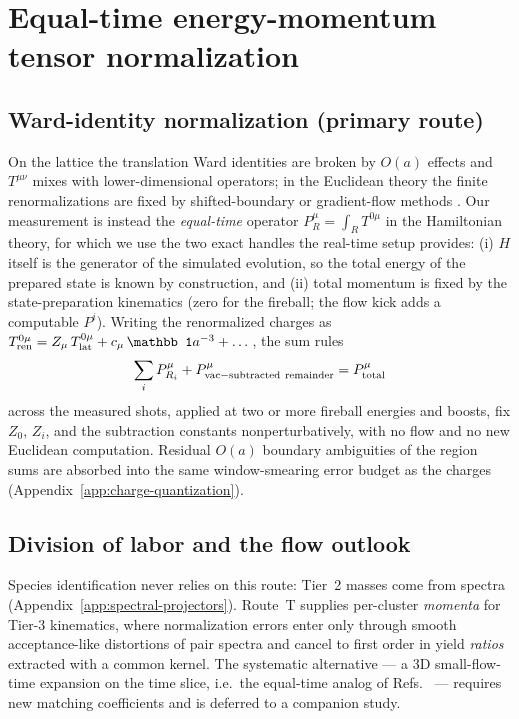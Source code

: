 \section{Equal-time energy-momentum tensor normalization}
\label{app:emt}

\subsection{Ward-identity normalization (primary route)}

On the lattice the translation Ward identities are broken by $O(a)$
effects and $T^{\mu\nu}$ mixes with lower-dimensional operators; in the
Euclidean theory the finite renormalizations are fixed by
shifted-boundary or gradient-flow methods
\cite{Suzuki:2013gza,Makino:2014taa,DallaBrida:2020gux}.  Our
measurement is instead the \emph{equal-time} operator
$P^\mu_R=\int_R T^{0\mu}$ in the Hamiltonian theory, for which we use
the two exact handles the real-time setup provides:
(i) $H$ itself is the generator of the simulated evolution, so the
total energy of the prepared state is known by construction, and
(ii) total momentum is fixed by the state-preparation kinematics
(zero for the fireball; the flow kick adds a computable $P^i$).
Writing the renormalized charges as
$T^{0\mu}_{\rm ren}=Z_{\mu}\,T^{0\mu}_{\rm lat}+c_\mu\,\mathbb 1 a^{-3}
+\dots$, the sum rules
\begin{equation}
\sum_i P^\mu_{R_i} + P^\mu_{\rm vac-subtracted\ remainder}
= P^\mu_{\rm total}
\end{equation}
across the measured shots, applied at two or more fireball energies and
boosts, fix $Z_0$, $Z_i$, and the subtraction constants
nonperturbatively, with no flow and no new Euclidean computation.
Residual $O(a)$ boundary ambiguities of the region sums are absorbed
into the same window-smearing error budget as the charges
(Appendix~\ref{app:charge-quantization}).

\subsection{Division of labor and the flow outlook}

Species identification never relies on this route: Tier~2 masses come
from spectra (Appendix~\ref{app:spectral-projectors}).  Route~T supplies
per-cluster \emph{momenta} for Tier-3 kinematics, where normalization
errors enter only through smooth acceptance-like distortions of pair
spectra and cancel to first order in yield \emph{ratios} extracted with
a common kernel.  The systematic alternative --- a 3D small-flow-time
expansion on the time slice, i.e.\ the equal-time analog of
Refs.~\cite{Suzuki:2013gza,Makino:2014taa} --- requires new matching
coefficients and is deferred to a companion study.
